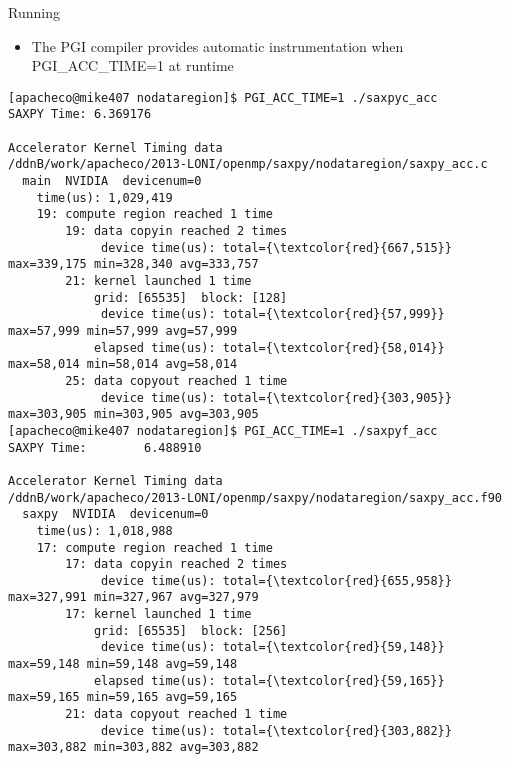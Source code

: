 \documentclass[c,mathserif,compress,xcolor=svgnames]{beamer}
\newenvironment{bblock}[0]
{
\begin{beamerboxesrounded}[upper=uppercol1,lower=lowercol1,shadow=true]}
{\end{beamerboxesrounded}}
\begin{document}
\begin{frame}[fragile]{\small Running}
  \begin{itemize}
    \item The PGI compiler provides automatic instrumentation when {\color{orange}PGI\_ACC\_TIME=1} at runtime
  \end{itemize}
  \begin{bblock}{}
    \begin{Verbatim}[fontsize=\fontsize{5}{6}\selectfont,commandchars=\\\{\}]
[apacheco@mike407 nodataregion]$ PGI_ACC_TIME=1 ./saxpyc_acc
SAXPY Time: 6.369176

Accelerator Kernel Timing data
/ddnB/work/apacheco/2013-LONI/openmp/saxpy/nodataregion/saxpy_acc.c
  main  NVIDIA  devicenum=0
    time(us): 1,029,419
    19: compute region reached 1 time
        19: data copyin reached 2 times
             device time(us): total={\textcolor{red}{667,515}} max=339,175 min=328,340 avg=333,757
        21: kernel launched 1 time
            grid: [65535]  block: [128]
             device time(us): total={\textcolor{red}{57,999}} max=57,999 min=57,999 avg=57,999
            elapsed time(us): total={\textcolor{red}{58,014}} max=58,014 min=58,014 avg=58,014
        25: data copyout reached 1 time
             device time(us): total={\textcolor{red}{303,905}} max=303,905 min=303,905 avg=303,905
[apacheco@mike407 nodataregion]$ PGI_ACC_TIME=1 ./saxpyf_acc
SAXPY Time:        6.488910

Accelerator Kernel Timing data
/ddnB/work/apacheco/2013-LONI/openmp/saxpy/nodataregion/saxpy_acc.f90
  saxpy  NVIDIA  devicenum=0
    time(us): 1,018,988
    17: compute region reached 1 time
        17: data copyin reached 2 times
             device time(us): total={\textcolor{red}{655,958}} max=327,991 min=327,967 avg=327,979
        17: kernel launched 1 time
            grid: [65535]  block: [256]
             device time(us): total={\textcolor{red}{59,148}} max=59,148 min=59,148 avg=59,148
            elapsed time(us): total={\textcolor{red}{59,165}} max=59,165 min=59,165 avg=59,165
        21: data copyout reached 1 time
             device time(us): total={\textcolor{red}{303,882}} max=303,882 min=303,882 avg=303,882
    \end{Verbatim}
  \end{bblock}
\end{frame}
\end{document}
